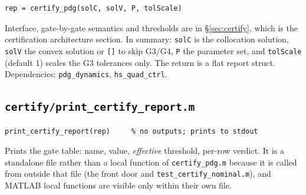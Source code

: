 \documentclass[11pt]{article}
\newcommand{\file}[1]{\texttt{#1}}
\begin{document}
\begin{verbatim}
rep = certify_pdg(solC, solV, P, tolScale)
\end{verbatim}

Interface, gate-by-gate semantics and thresholds are in
\S\ref{sec:certify}, which is the certification architecture section. In
summary: \texttt{solC} is the collocation solution, \texttt{solV} the convex
solution or \texttt{[]} to skip G3/G4, \texttt{P} the parameter set, and
\texttt{tolScale} (default 1) scales the G3 tolerances only. The return is a
flat report struct. Dependencies: \texttt{pdg\_dynamics},
\texttt{hs\_quad\_ctrl}.

\subsection{\texttt{certify/print\_certify\_report.m}}
\label{sec:mod:print}

\begin{verbatim}
print_certify_report(rep)     % no outputs; prints to stdout
\end{verbatim}

Prints the gate table: name, value, \emph{effective} threshold, per-row
verdict. It is a standalone file rather than a local function of
\file{certify\_pdg.m} because it is called from outside that file (the front
door and \file{test\_certify\_nominal.m}), and MATLAB local functions are
visible only within their own file.
\end{document}
